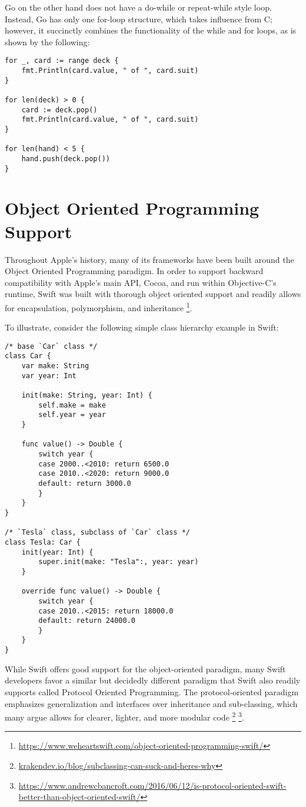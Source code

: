 \documentclass[letterpaper]{article}
\begin{document}
Go on the other hand does not have a do-while or repeat-while style loop. Instead, Go has only one for-loop structure, which takes influence from C; however, it succinctly combines the functionality of the while and for loops, as is shown by the following:

\begin{verbatim}
for _, card := range deck {
    fmt.Println(card.value, " of ", card.suit)
}

for len(deck) > 0 {
    card := deck.pop()
    fmt.Println(card.value, " of ", card.suit)
}

for len(hand) < 5 {
    hand.push(deck.pop())
}
\end{verbatim}

\section{Object Oriented Programming Support}

Throughout Apple’s history, many of its frameworks have been built around the Object Oriented Programming paradigm. In order to support backward compatibility with Apple’s main API, Cocoa, and run within Objective-C’s runtime, Swift was built with thorough object oriented support and readily allows for encapsulation, polymorphism, and inheritance \footnote{\url{https://www.weheartswift.com/object-oriented-programming-swift/}}.

To illustrate, consider the following simple class hierarchy example in Swift:

\begin{verbatim}
/* base `Car` class */
class Car {
    var make: String
    var year: Int

    init(make: String, year: Int) {
        self.make = make
        self.year = year
    }

    func value() -> Double {
        switch year {
        case 2000..<2010: return 6500.0
        case 2010..<2020: return 9000.0
        default: return 3000.0
        }
    }
}

/* `Tesla` class, subclass of `Car` class */
class Tesla: Car {
    init(year: Int) {
        super.init(make: "Tesla":, year: year)
    }

    override func value() -> Double {
        switch year {
        case 2010..<2015: return 18000.0
        default: return 24000.0
        }
    }
}
\end{verbatim}

While Swift offers good support for the object-oriented paradigm, many Swift developers favor a similar but decidedly different paradigm that Swift also readily supports called Protocol Oriented Programming. The protocol-oriented paradigm emphasizes generalization and interfaces over inheritance and sub-classing, which many argue allows for clearer, lighter, and more modular code \footnote{\url{krakendev.io/blog/subclassing-can-suck-and-heres-why}} \footnote{\url{https://www.andrewcbancroft.com/2016/06/12/is-protocol-oriented-swift-
better-than-object-oriented-swift/}}.
\end{document}
